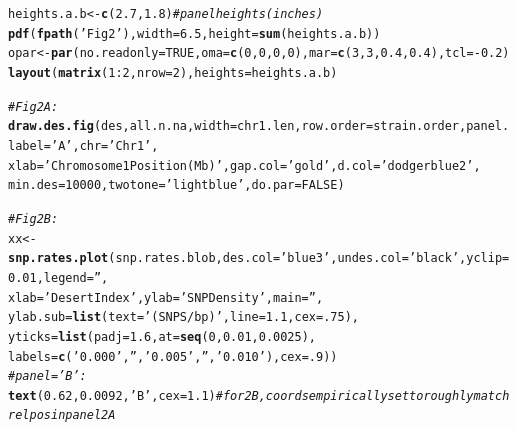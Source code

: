 \documentclass{article}\usepackage[]{graphicx}\usepackage[]{color}
\makeatletter
\newcommand{\hlnum}[1]{\textcolor[rgb]{0.686,0.059,0.569}{#1}}%
\newcommand{\hlstr}[1]{\textcolor[rgb]{0.192,0.494,0.8}{#1}}%
\newcommand{\hlcom}[1]{\textcolor[rgb]{0.678,0.584,0.686}{\textit{#1}}}%
\newcommand{\hlopt}[1]{\textcolor[rgb]{0,0,0}{#1}}%
\newcommand{\hlstd}[1]{\textcolor[rgb]{0.345,0.345,0.345}{#1}}%
\newcommand{\hlkwb}[1]{\textcolor[rgb]{0.69,0.353,0.396}{#1}}%
\newcommand{\hlkwc}[1]{\textcolor[rgb]{0.333,0.667,0.333}{#1}}%
\newcommand{\hlkwd}[1]{\textcolor[rgb]{0.737,0.353,0.396}{\textbf{#1}}}%
\newenvironment{kframe}{%
 \def\at@end@of@kframe{}%
 \ifinner\ifhmode%
  \def\at@end@of@kframe{\end{minipage}}%
  \begin{minipage}{\columnwidth}%
 \fi\fi%
 \def\FrameCommand##1{\hskip\@totalleftmargin \hskip-\fboxsep
 \colorbox{shadecolor}{##1}\hskip-\fboxsep
     \hskip-\linewidth \hskip-\@totalleftmargin \hskip\columnwidth}%
 \MakeFramed {\advance\hsize-\width
   \@totalleftmargin\z@ \linewidth\hsize
   \@setminipage}}%
 {\par\unskip\endMakeFramed%
 \at@end@of@kframe}
\newenvironment{knitrout}{}{} %
\makeatother
\begin{document}
\begin{knitrout}\footnotesize
{}\color{fgcolor}\begin{kframe}
\begin{alltt}
\hlstd{heights.a.b} \hlkwb{<-} \hlkwd{c}\hlstd{(}\hlnum{2.7}\hlstd{,} \hlnum{1.8}\hlstd{)} \hlcom{# panel heights (inches)}
\hlkwd{pdf}\hlstd{(}\hlkwd{fpath}\hlstd{(}\hlstr{'Fig2'}\hlstd{),}\hlkwc{width}\hlstd{=}\hlnum{6.5}\hlstd{,} \hlkwc{height}\hlstd{=}\hlkwd{sum}\hlstd{(heights.a.b))}
\hlstd{opar} \hlkwb{<-} \hlkwd{par}\hlstd{(}\hlkwc{no.readonly}\hlstd{=}\hlnum{TRUE}\hlstd{,} \hlkwc{oma}\hlstd{=}\hlkwd{c}\hlstd{(}\hlnum{0}\hlstd{,}\hlnum{0}\hlstd{,}\hlnum{0}\hlstd{,}\hlnum{0}\hlstd{),} \hlkwc{mar}\hlstd{=}\hlkwd{c}\hlstd{(}\hlnum{3}\hlstd{,}\hlnum{3}\hlstd{,}\hlnum{0.4}\hlstd{,}\hlnum{0.4}\hlstd{),} \hlkwc{tcl}\hlstd{=}\hlopt{-}\hlnum{0.2}\hlstd{)}
\hlkwd{layout}\hlstd{(}\hlkwd{matrix}\hlstd{(}\hlnum{1}\hlopt{:}\hlnum{2}\hlstd{,}\hlkwc{nrow}\hlstd{=}\hlnum{2}\hlstd{),} \hlkwc{heights}\hlstd{=heights.a.b)}

\hlcom{# Fig 2A:}
\hlkwd{draw.des.fig}\hlstd{(des, all.n.na,} \hlkwc{width}\hlstd{=chr1.len,} \hlkwc{row.order}\hlstd{=strain.order,} \hlkwc{panel.label}\hlstd{=}\hlstr{'A'}\hlstd{,} \hlkwc{chr}\hlstd{=}\hlstr{'Chr1'}\hlstd{,}
             \hlkwc{xlab}\hlstd{=}\hlstr{'Chromosome 1 Position (Mb)'}\hlstd{,} \hlkwc{gap.col} \hlstd{=} \hlstr{'gold'}\hlstd{,} \hlkwc{d.col}\hlstd{=}\hlstr{'dodgerblue2'}\hlstd{,}
             \hlkwc{min.des}\hlstd{=}\hlnum{10000}\hlstd{,} \hlkwc{twotone}\hlstd{=}\hlstr{'lightblue'}\hlstd{,} \hlkwc{do.par}\hlstd{=}\hlnum{FALSE}\hlstd{)}

\hlcom{# Fig 2B:}
\hlstd{xx} \hlkwb{<-} \hlkwd{snp.rates.plot}\hlstd{(snp.rates.blob,} \hlkwc{des.col}\hlstd{=}\hlstr{'blue3'}\hlstd{,} \hlkwc{undes.col}\hlstd{=}\hlstr{'black'}\hlstd{,} \hlkwc{yclip}\hlstd{=}\hlnum{0.01}\hlstd{,} \hlkwc{legend}\hlstd{=}\hlstr{''}\hlstd{,}
                     \hlkwc{xlab}\hlstd{=}\hlstr{'Desert Index'}\hlstd{,} \hlkwc{ylab}\hlstd{=}\hlstr{'SNP Density'}\hlstd{,} \hlkwc{main}\hlstd{=}\hlstr{''}\hlstd{,}
                     \hlkwc{ylab.sub}\hlstd{=}\hlkwd{list}\hlstd{(}\hlkwc{text}\hlstd{=}\hlstr{'(SNPS / bp)'}\hlstd{,} \hlkwc{line}\hlstd{=}\hlnum{1.1}\hlstd{,} \hlkwc{cex}\hlstd{=}\hlnum{.75}\hlstd{),}
                     \hlkwc{yticks}\hlstd{=}\hlkwd{list}\hlstd{(}\hlkwc{padj}\hlstd{=}\hlnum{1.6}\hlstd{,} \hlkwc{at}\hlstd{=}\hlkwd{seq}\hlstd{(}\hlnum{0}\hlstd{,}\hlnum{0.01}\hlstd{,}\hlnum{0.0025}\hlstd{),}
                                 \hlkwc{labels}\hlstd{=}\hlkwd{c}\hlstd{(}\hlstr{'0.000'}\hlstd{,}\hlstr{''}\hlstd{,}\hlstr{'0.005'}\hlstd{,}\hlstr{''}\hlstd{,}\hlstr{'0.010'}\hlstd{),} \hlkwc{cex}\hlstd{=}\hlnum{.9}\hlstd{))}
\hlcom{# panel='B':}
\hlkwd{text}\hlstd{(}\hlnum{0.62}\hlstd{,}\hlnum{0.0092}\hlstd{,}\hlstr{'B'}\hlstd{,}\hlkwc{cex}\hlstd{=}\hlnum{1.1}\hlstd{)} \hlcom{# for 2B, coords empirically set to roughly match rel pos in panel 2A}


\end{alltt}
\end{kframe}
\end{knitrout}
\end{document}

